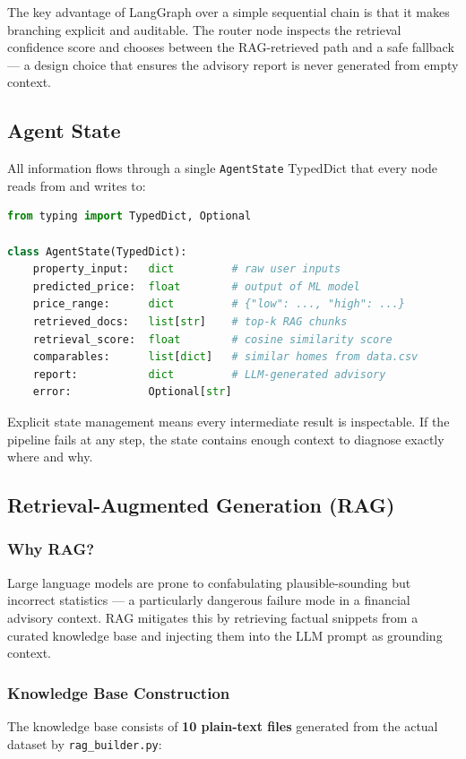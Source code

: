 \documentclass[12pt, a4paper]{article}
\begin{document}
The key advantage of LangGraph over a simple sequential chain is that it makes
branching explicit and auditable. The router node inspects the retrieval confidence
score and chooses between the RAG-retrieved path and a safe fallback --- a design
choice that ensures the advisory report is never generated from empty context.

\subsection{Agent State}

All information flows through a single \texttt{AgentState} TypedDict that every
node reads from and writes to:

\begin{lstlisting}[language=Python, caption={AgentState definition (agent/state.py)}]
from typing import TypedDict, Optional

class AgentState(TypedDict):
    property_input:   dict         # raw user inputs
    predicted_price:  float        # output of ML model
    price_range:      dict         # {"low": ..., "high": ...}
    retrieved_docs:   list[str]    # top-k RAG chunks
    retrieval_score:  float        # cosine similarity score
    comparables:      list[dict]   # similar homes from data.csv
    report:           dict         # LLM-generated advisory
    error:            Optional[str]
\end{lstlisting}

Explicit state management means every intermediate result is inspectable.
If the pipeline fails at any step, the state contains enough context to diagnose
exactly where and why.

\subsection{Retrieval-Augmented Generation (RAG)}

\subsubsection{Why RAG?}
Large language models are prone to confabulating plausible-sounding but incorrect
statistics --- a particularly dangerous failure mode in a financial advisory context.
RAG mitigates this by retrieving factual snippets from a curated knowledge base and
injecting them into the LLM prompt as grounding context.

\subsubsection{Knowledge Base Construction}
The knowledge base consists of \textbf{10 plain-text files} generated from the
actual dataset by \texttt{rag\_builder.py}:
\end{document}
